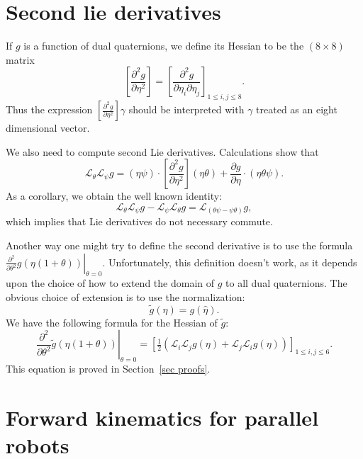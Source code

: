 \documentclass[reqno,12pt]{amsart}
\newcommand{\liederiv}{\mathcal L}
\begin{document}
\section{Second lie derivatives}

If $g$ is a function of dual quaternions, we define its Hessian to be the $(8 \times 8)$ matrix
\begin{equation}
\left[\frac{\partial^2 g}{\partial \eta^2}\right] = \left[\frac{\partial^2 g}{\partial \eta_i\partial \eta_j}\right] _{ 1 \le i,j \le 8 }.
\end{equation}
Thus the expression $\left[\frac{\partial^2 g}{\partial \eta^2}\right] \gamma$ should be interpreted with $\gamma$ treated as an eight dimensional vector.

We also need to compute second Lie derivatives.  Calculations show that
\begin{equation}
\label{second lie deriv}
\liederiv_\theta \liederiv_\psi g = (\eta \psi) \cdot \left[\frac{\partial^2 g}{\partial \eta^2}\right](\eta \theta) + \frac{\partial g}{\partial \eta} \cdot (\eta \theta \psi) .
\end{equation}
As a corollary, we obtain the well known identity:
\begin{equation}
\label{lie bracket diff = diff lie bracket}
\liederiv_\theta \liederiv_\psi g - \liederiv_\psi \liederiv_\theta g = \liederiv_{(\theta\psi - \psi\theta)} g,
\end{equation}
which implies that Lie derivatives do not necessary commute.

Another way one might try to define the second derivative is to use the formula $\left.\frac {\partial^2}{\partial\theta^2} g(\eta(1+\theta)) \right | _{\theta=0}$.  Unfortunately, this definition doesn't work, as it depends upon the choice of how to extend the domain of $g$ to all dual quaternions.  The obvious choice of extension is to use the normalization:
\begin{equation}
\tilde g(\eta) = g(\hat\eta) .
\end{equation}
We have the following formula for the Hessian of $\tilde g$:
\begin{equation}
\label{hessian}
\left.\frac{\partial^2}{\partial\theta^2} \tilde g(\eta(1+\theta)) \right|_{\theta = 0} = \left[\tfrac12 (\liederiv_i \liederiv_j g(\eta) + \liederiv_j \liederiv_i g(\eta)) \right]_{1\le i,j\le 6}.
\end{equation}
This equation is proved in Section~\ref{sec proofs}.

\section{Forward kinematics for parallel robots}
\label{forward kinematics}
\end{document}
